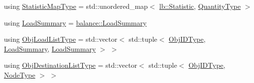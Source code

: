 \begin{DoxyCompactItemize}
\item 
using \hyperlink{structvt_1_1vrt_1_1collection_1_1lb_1_1_base_l_b_acd9bdad961ac83c96b7a227de672f96c}{Statistic\+Map\+Type} = std\+::unordered\+\_\+map$<$ \hyperlink{namespacevt_1_1vrt_1_1collection_1_1lb_af0e20ef9afee77295053aa83bf1348b1}{lb\+::\+Statistic}, \hyperlink{structvt_1_1vrt_1_1collection_1_1lb_1_1_base_l_b_a864b2c437d81680577013741e265ef0d}{Quantity\+Type} $>$
\item 
using \hyperlink{structvt_1_1vrt_1_1collection_1_1lb_1_1_base_l_b_aa78583f362acc50fcca87d4ce3150151}{Load\+Summary} = \hyperlink{structvt_1_1vrt_1_1collection_1_1balance_1_1_load_summary}{balance\+::\+Load\+Summary}
\item 
using \hyperlink{structvt_1_1vrt_1_1collection_1_1lb_1_1_base_l_b_ab19ea4bb93a63cd22645cc03a58651f1}{Obj\+Load\+List\+Type} = std\+::vector$<$ std\+::tuple$<$ \hyperlink{structvt_1_1vrt_1_1collection_1_1lb_1_1_base_l_b_a790b22acf448880599724749cdc4e9b3}{Obj\+I\+D\+Type}, \hyperlink{structvt_1_1vrt_1_1collection_1_1lb_1_1_base_l_b_aa78583f362acc50fcca87d4ce3150151}{Load\+Summary}, \hyperlink{structvt_1_1vrt_1_1collection_1_1lb_1_1_base_l_b_aa78583f362acc50fcca87d4ce3150151}{Load\+Summary} $>$ $>$
\item 
using \hyperlink{structvt_1_1vrt_1_1collection_1_1lb_1_1_base_l_b_ad50ba1022c6beeb6e9187a8f1a3e16fe}{Obj\+Destination\+List\+Type} = std\+::vector$<$ std\+::tuple$<$ \hyperlink{structvt_1_1vrt_1_1collection_1_1lb_1_1_base_l_b_a790b22acf448880599724749cdc4e9b3}{Obj\+I\+D\+Type}, \hyperlink{namespacevt_a866da9d0efc19c0a1ce79e9e492f47e2}{Node\+Type} $>$ $>$
\end{DoxyCompactItemize}

